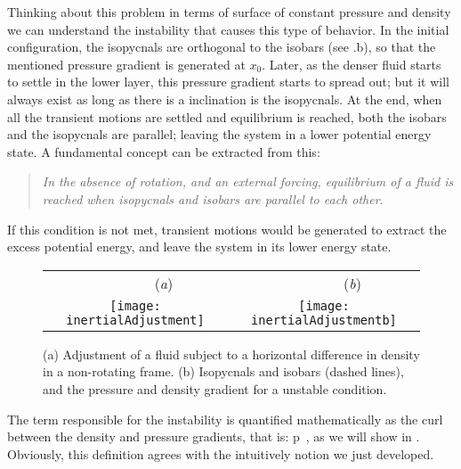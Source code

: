Thinking about this problem in terms of surface of constant pressure and
density we can understand the instability that causes this type of
behavior. In the initial configuration, the isopycnals are orthogonal to
the isobars (see .b), so that the mentioned pressure
gradient is generated at $x_0$. Later, as the denser fluid starts to
settle in the lower layer, this pressure gradient starts to spread out;
but it will always exist as long as there is a inclination is the
isopycnals. At the end, when all the transient motions are settled and
equilibrium is reached, both  the isobars and the isopycnals are
parallel; leaving the system in a lower potential energy state. A
fundamental concept can be extracted from this:

\begin{quote}
\emph{In the absence of rotation, and an external forcing, equilibrium of
a fluid is reached when isopycnals and isobars are parallel to each
other}.
\end{quote}


If this condition is not met, transient motions would be generated to extract the excess  potential energy, and leave the system in its lower energy state.

\begin{figure}[t]
\begin{center}
 \begin{tabular}{cc}
        ~~~~~~~~(\textit{a})                        &   ~~~~~~~~(\textit{b}) \\
    \texttt{[image: inertialAdjustment]}
    & \texttt{[image: inertialAdjustmentb]}

  \end{tabular}
\end{center}
\caption{
(a) Adjustment of a fluid subject to a horizontal difference in density
    in a non-rotating frame.
(b) Isopycnals and isobars (dashed lines), and the pressure and density
    gradient for a unstable condition.
        }
\label{f:drivedrag}
\end{figure}

The term responsible for the instability is quantified mathematically as
the curl between the density and pressure gradients, that is:
\beq
\nabla \rho \times \nabla p
\,,
as we will show in . Obviously, this definition
agrees with the intuitively notion we just developed.

